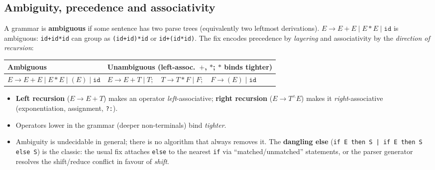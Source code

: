\documentclass[10pt,a4paper,openany,oneside]{report}
\begin{document}
\subsection{Ambiguity, precedence and associativity}
A grammar is \textbf{ambiguous} if some sentence has two parse trees (equivalently two leftmost derivations). $E\to E+E\mid E*E\mid\texttt{id}$ is ambiguous: \texttt{id+id*id} can group as \texttt{(id+id)*id} or \texttt{id+(id*id)}. The fix encodes precedence by \emph{layering} and associativity by the \emph{direction of recursion}:
\begin{center}
\begin{tabular}{@{}ll@{}}
\toprule
\textbf{Ambiguous} & \textbf{Unambiguous (left-assoc.\ $+$, $*$; $*$ binds tighter)}\\
\midrule
$E\to E+E\mid E*E\mid(E)\mid \texttt{id}$ & $E\to E+T\mid T;\quad T\to T*F\mid F;\quad F\to(E)\mid\texttt{id}$\\
\bottomrule
\end{tabular}
\end{center}
\begin{mustbox}
\begin{itemize}[nosep]
\item \textbf{Left recursion} ($E\to E+T$) makes an operator \emph{left}-associative; \textbf{right recursion} ($E\to T^{\wedge}E$) makes it \emph{right}-associative (exponentiation, assignment, \texttt{?:}).
\item Operators lower in the grammar (deeper non-terminals) bind \emph{tighter}.
\item Ambiguity is undecidable in general; there is no algorithm that always removes it. The \textbf{dangling else} (\texttt{if E then S | if E then S else S}) is the classic: the usual fix attaches \texttt{else} to the nearest \texttt{if} via ``matched/unmatched'' statements, or the parser generator resolves the shift/reduce conflict in favour of \emph{shift}.
\end{itemize}
\end{mustbox}
\end{document}
